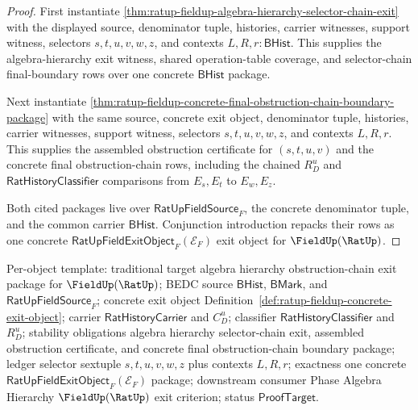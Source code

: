 \begin{proof}
First instantiate
\autoref{thm:ratup-fieldup-algebra-hierarchy-selector-chain-exit} with the
displayed source, denominator tuple, histories, carrier witnesses, support
witness, selectors $s,t,u,v,w,z$, and contexts $L,R,r:\mathsf{BHist}$. This
supplies the algebra-hierarchy exit witness, shared operation-table coverage,
and selector-chain final-boundary rows over one concrete $\mathsf{BHist}$
package.

Next instantiate
\autoref{thm:ratup-fieldup-concrete-final-obstruction-chain-boundary-package}
with the same source, concrete exit object, denominator tuple, histories,
carrier witnesses, support witness, selectors $s,t,u,v,w,z$, and contexts
$L,R,r$. This supplies the assembled obstruction certificate for $(s,t,u,v)$
and the concrete final obstruction-chain rows, including the chained $R_D^u$
and $\mathsf{RatHistoryClassifier}$ comparisons from $E_s,E_t$ to $E_w,E_z$.

Both cited packages live over $\mathsf{RatUpFieldSource}_F$, the concrete
denominator tuple, and the common carrier $\mathsf{BHist}$. Conjunction
introduction repacks their rows as one concrete
$\mathsf{RatUpFieldExitObject}_F(\mathcal E_F)$ exit object for
$\FieldUp(\RatUp)$.
\end{proof}

Per-object template: traditional target algebra hierarchy obstruction-chain
exit package for $\FieldUp(\RatUp)$; BEDC source $\mathsf{BHist}$,
$\mathsf{BMark}$, and $\mathsf{RatUpFieldSource}_F$; concrete exit object
Definition~\ref{def:ratup-fieldup-concrete-exit-object}; carrier
$\mathsf{RatHistoryCarrier}$ and $C_D^u$; classifier
$\mathsf{RatHistoryClassifier}$ and $R_D^u$; stability obligations algebra
hierarchy selector-chain exit, assembled obstruction certificate, and concrete
final obstruction-chain boundary package; ledger selector sextuple
$s,t,u,v,w,z$ plus contexts $L,R,r$; exactness one concrete
$\mathsf{RatUpFieldExitObject}_F(\mathcal E_F)$ package; downstream consumer
Phase Algebra Hierarchy $\FieldUp(\RatUp)$ exit criterion; status
$\mathsf{ProofTarget}$.

